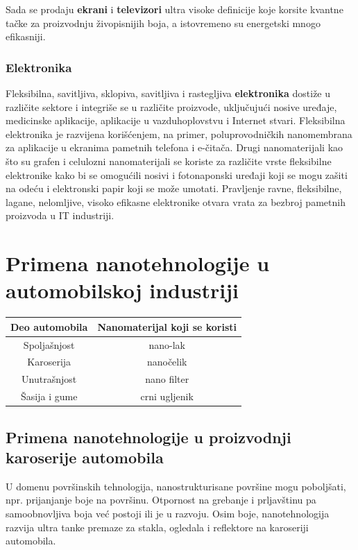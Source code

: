 \documentclass[a4paper]{article}
\begin{document}
{Sada se prodaju \textbf{ekrani} i \textbf{televizori} ultra visoke definicije koje korsite kvantne tačke za proizvodnju živopisnijih boja, a istovremeno su energetski mnogo efikasniji.\\

\subsubsection{Elektronika}
Fleksibilna, savitljiva, sklopiva, savitljiva i rastegljiva \textbf{elektronika} dostiže u različite sektore i integriše se u različite proizvode, uključujući nosive uređaje, medicinske aplikacije, aplikacije u vazduhoplovstvu i Internet stvari. Fleksibilna elektronika je razvijena korišćenjem, na primer, poluprovodničkih nanomembrana za aplikacije u ekranima pametnih telefona i e-čitača. Drugi nanomaterijali kao što su grafen i celulozni nanomaterijali se koriste za različite vrste fleksibilne elektronike kako bi se omogućili nosivi i  fotonaponski uređaji koji se mogu zašiti na odeću i elektronski papir koji se može umotati. Pravljenje ravne, fleksibilne, lagane, nelomljive, visoko efikasne elektronike otvara vrata za bezbroj pametnih proizvoda u IT industriji.

\section{Primena nanotehnologije u automobilskoj industriji}

\begin{table}[h!]
\begin{center}
\begin{tabular}{|c|c|}
\hline
Deo automobila & Nanomaterijal koji se koristi \\
\hline
Spoljašnjost & nano-lak \\
\hline
Karoserija & nanočelik \\
\hline
Unutrašnjost & nano filter \\
\hline
Šasija i gume & crni ugljenik \\
\hline
\end{tabular}
\end{center}
\end{table}

\subsection{Primena nanotehnologije u proizvodnji karoserije automobila}

U domenu površinskih tehnologija, nanostrukturisane površine mogu poboljšati, npr. prijanjanje boje na površinu. Otpornost na grebanje i prljavštinu pa samoobnovljiva boja već postoji ili je u razvoju. Osim boje, nanotehnologija razvija ultra tanke premaze za stakla, ogledala i reflektore na karoseriji automobila.\\

}
\end{document}

